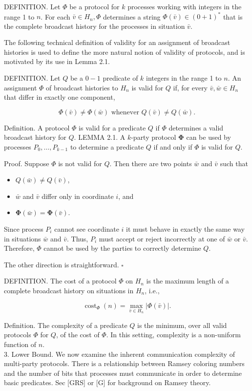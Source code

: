 \documentclass[10pt]{article}
\begin{document}
DEFINITION. Let $\Phi$ be a protocol for $k$ processes working with integers in the range 1 to $n$. For each $\bar{v} \in H_{n}, \Phi$ determines a string $\Phi(\bar{v}) \in(0+1)^{*}$ that is the complete broadcast history for the processes in situation $\bar{v}$.

The following technical definition of validity for an assignment of broadcast histories is used to define the more natural notion of validity of protocols, and is motivated by its use in Lemma 2.1.

DEFINITION. Let $Q$ be a $0-1$ predicate of $k$ integers in the range 1 to $n$. An assignment $\Phi$ of broadcast histories to $H_{n}$ is valid for $Q$ if, for every $\bar{v}, \bar{w} \in H_{n}$ that differ in exactly one component,

$$
\Phi(\bar{v}) \neq \Phi(\bar{w}) \text { whenever } Q(\bar{v}) \neq Q(\bar{w}) .
$$

Definition. A protocol $\Phi$ is valid for a predicate $Q$ if $\Phi$ determines a valid broadcast history for $Q$. LEMMA 2.1. A $k$-party protocol $\boldsymbol{\Phi}$ can be used by processes $P_{0}, \ldots, P_{k-1}$ to determine a predicate $Q$ if and only if $\Phi$ is valid for $Q$.

Proof. Suppose $\Phi$ is not valid for $Q$. Then there are two points $\bar{w}$ and $\bar{v}$ such that

\begin{itemize}
  \item[(a)] $Q(\bar{w}) \neq Q(\bar{v})$,
  \item[(b)] $\bar{w}$ and $\bar{v}$ differ only in coordinate $i$, and
  \item[(c)] $\boldsymbol{\Phi}(\bar{w})=\boldsymbol{\Phi}(\bar{v})$.
\end{itemize}

Since process $P_{i}$ cannot see coordinate $i$ it must behave in exactly the same way in situations $\bar{w}$ and $\bar{v}$. Thus, $P_{i}$ must accept or reject incorrectly at one of $\bar{w}$ or $\bar{v}$. Therefore, $\Phi$ cannot be used by the parties to correctly determine $Q$.

The other direction is straightforward. \(\square\)

DEFINITION. The cost of a protocol $\Phi$ on $H_{n}$ is the maximum length of a complete broadcast history on situations in $H_{n}$, i.e.,

$$
\operatorname{cost}_{\Phi}(n)=\max _{\bar{v} \in H_{n}}|\Phi(\bar{v})| .
$$

Definition. The complexity of a predicate $Q$ is the minimum, over all valid protocols $\Phi$ for $Q$, of the cost of $\Phi$. In this setting, complexity is a non-uniform function of $n$.\\[0pt]
3. Lower Bound. We now examine the inherent communication complexity of multi-party protocols. There is a relationship between Ramsey coloring numbers and the number of bits that processes must communicate in order to determine basic predicates. Sec [GRS] or [G] for background on Ramsey theory.
\end{document}
